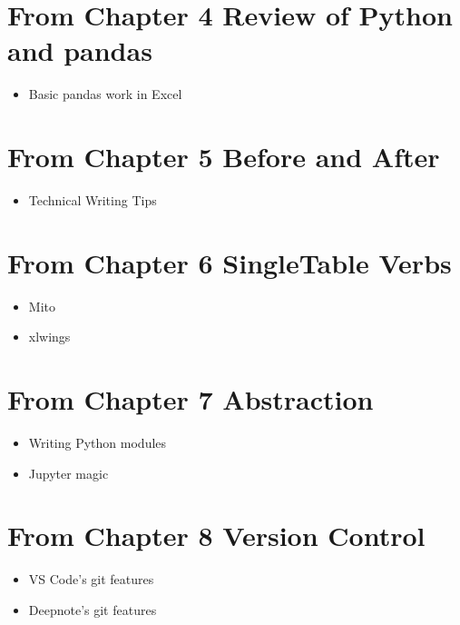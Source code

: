 \documentclass[letterpaper,10pt,english]{jupyterBook}
\begin{document}
\section{From Chapter 4 \sphinxhyphen{} Review of Python and pandas}
\label{\detokenize{loyo-list:from-chapter-4-review-of-python-and-pandas}}\begin{itemize}
\item {} 
\sphinxAtStartPar
Basic pandas work in Excel

\end{itemize}


\section{From Chapter 5 \sphinxhyphen{} Before and After}
\label{\detokenize{loyo-list:from-chapter-5-before-and-after}}\begin{itemize}
\item {} 
\sphinxAtStartPar
Technical Writing Tips

\end{itemize}


\section{From Chapter 6 \sphinxhyphen{} Single\sphinxhyphen{}Table Verbs}
\label{\detokenize{loyo-list:from-chapter-6-single-table-verbs}}\begin{itemize}
\item {} 
\sphinxAtStartPar
Mito

\item {} 
\sphinxAtStartPar
xlwings

\end{itemize}


\section{From Chapter 7 \sphinxhyphen{} Abstraction}
\label{\detokenize{loyo-list:from-chapter-7-abstraction}}\begin{itemize}
\item {} 
\sphinxAtStartPar
Writing Python modules

\item {} 
\sphinxAtStartPar
Jupyter  magic

\end{itemize}


\section{From Chapter 8 \sphinxhyphen{} Version Control}
\label{\detokenize{loyo-list:from-chapter-8-version-control}}\begin{itemize}
\item {} 
\sphinxAtStartPar
VS Code’s git features

\item {} 
\sphinxAtStartPar
Deepnote’s git features

\end{itemize}
\end{document}
